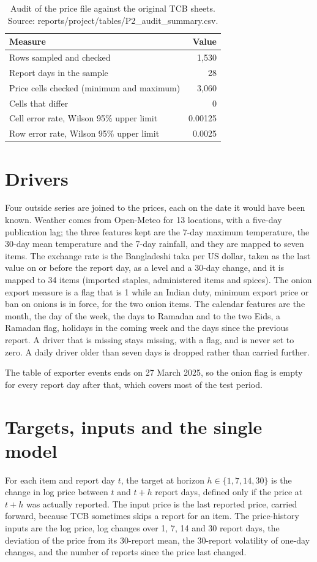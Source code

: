\documentclass[12pt]{report}
\begin{document}
\begin{table}[H]\centering\small
\caption{Audit of the price file against the original TCB sheets. Source: reports/project/tables/P2\_audit\_summary.csv.}\label{tab:audit}
\begin{tabular}{lr}
\toprule
Measure & Value \\
\midrule
Rows sampled and checked & 1,530 \\
Report days in the sample & 28 \\
Price cells checked (minimum and maximum) & 3,060 \\
Cells that differ & 0 \\
Cell error rate, Wilson 95\% upper limit & 0.00125 \\
Row error rate, Wilson 95\% upper limit & 0.0025 \\
\bottomrule
\end{tabular}
\end{table}

\section{Drivers}
Four outside series are joined to the prices, each on the date it would have been known. Weather comes from Open-Meteo for 13 locations, with a five-day publication lag; the three features kept are the 7-day maximum temperature, the 30-day mean temperature and the 7-day rainfall, and they are mapped to seven items. The exchange rate is the Bangladeshi taka per US dollar, taken as the last value on or before the report day, as a level and a 30-day change, and it is mapped to 34 items (imported staples, administered items and spices). The onion export measure is a flag that is 1 while an Indian duty, minimum export price or ban on onions is in force, for the two onion items. The calendar features are the month, the day of the week, the days to Ramadan and to the two Eids, a Ramadan flag, holidays in the coming week and the days since the previous report. A driver that is missing stays missing, with a flag, and is never set to zero. A daily driver older than seven days is dropped rather than carried further.

The table of exporter events ends on 27 March 2025, so the onion flag is empty for every report day after that, which covers most of the test period.

\section{Targets, inputs and the single model}
For each item and report day $t$, the target at horizon $h \in \{1,7,14,30\}$ is the change in log price between $t$ and $t+h$ report days, defined only if the price at $t+h$ was actually reported. The input price is the last reported price, carried forward, because TCB sometimes skips a report for an item. The price-history inputs are the log price, log changes over 1, 7, 14 and 30 report days, the deviation of the price from its 30-report mean, the 30-report volatility of one-day changes, and the number of reports since the price last changed.
\end{document}
